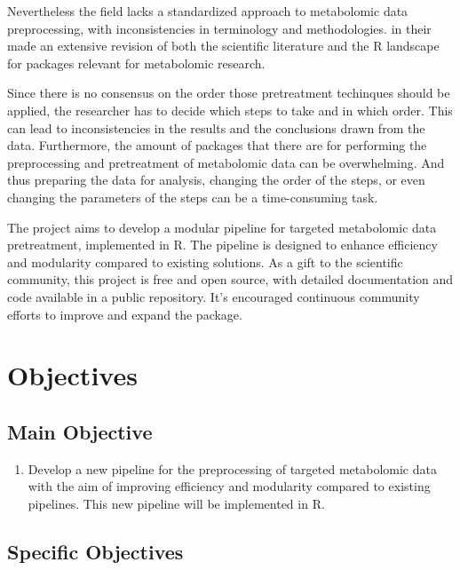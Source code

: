 \documentclass[ENG, BIB]{TFUOC}%
\begin{document}
Nevertheless the field lacks a standardized approach to metabolomic data preprocessing, with inconsistencies in terminology and methodologies. 
\citeauthor{stanstrupMetaRbolomicsToolboxBioconductor2019} in their  made an extensive revision of both the scientific literature and the R landscape for packages relevant for metabolomic research.

Since there is no consensus on the order those pretreatment techinques should be applied, the researcher has to decide which steps to take and in which order. This can lead to inconsistencies in the results and the conclusions drawn from the data. Furthermore, the amount of packages that there are for performing the preprocessing and pretreatment of metabolomic data can be overwhelming. And thus preparing the data for analysis, changing the order of the steps, or even changing the parameters of the steps can be a time-consuming task.

The project aims to develop a modular pipeline for targeted metabolomic data pretreatment, implemented in R. The pipeline is designed to enhance efficiency and modularity compared to existing solutions. As a gift to the scientific community, this project is free and open source, with detailed documentation and code available in a public repository. It's encouraged continuous community efforts to improve and expand the package.





\chapter{Objectives}

\section{Main Objective}
\begin{enumerate}
\item Develop a new pipeline for the preprocessing of targeted metabolomic data with the aim of improving efficiency and modularity compared to existing pipelines. This new pipeline will be implemented in R.
\end{enumerate}

\section{Specific Objectives}
\end{document}
